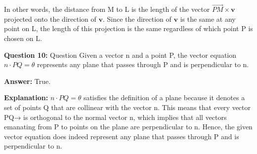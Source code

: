 \documentclass{article}
\begin{document}
In other words, the distance from M to L is the length of the vector $\overrightarrow{PM} \times \mathbf{v}$ projected onto the direction of $\mathbf{v}$. Since the direction of $\mathbf{v}$ is the same at any point on L, the length of this projection is the same regardless of which point P is chosen on L.



\pagebreak 

    
\textbf {Question 10:} Question
Given a vector n and a point P, the vector equation $n \cdot PQ = \theta$ represents any plane that passes through P and is perpendicular to n.

\textbf{Answer:} 
True.

\textbf{Explanation:} 
$n \cdot PQ = \theta$ satisfies the definition of a plane because it denotes a set of points Q that are collinear with the vector n. This means that every vector PQ→ is orthogonal to the normal vector n, which implies that all vectors emanating from P to points on the plane are perpendicular to n. Hence, the given vector equation does indeed represent any plane that passes through P and is perpendicular to n.



\pagebreak 

    
\end{document}
